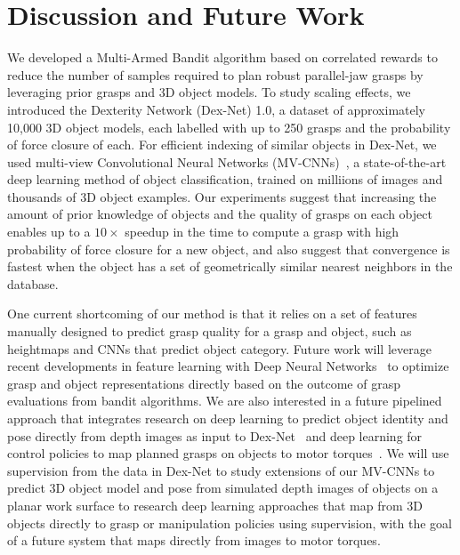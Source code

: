 \section{Discussion and Future Work}
We developed a Multi-Armed Bandit algorithm based on correlated rewards to reduce the number of samples required to plan robust parallel-jaw grasps by leveraging prior grasps and 3D object models.
To study scaling effects, we introduced the Dexterity Network (Dex-Net) 1.0, a dataset of approximately 10,000 3D object models, each labelled with up to 250 grasps and the probability of force closure of each.
For efficient indexing of similar objects in Dex-Net, we used multi-view Convolutional Neural Networks (MV-CNNs)~\cite{su2015multi}, a state-of-the-art deep learning method of object classification, trained on milliions of images and thousands of 3D object examples.
Our experiments suggest that increasing the amount of prior knowledge of objects and the quality of grasps on each object enables up to a $10\times$ speedup in the time to compute a grasp with high probability of force closure for a new object, and also suggest that convergence is fastest when the object has a set of geometrically similar nearest neighbors in the database.

One current shortcoming of our method is that it relies on a set of features manually designed to predict grasp quality for a grasp and object, such as heightmaps and CNNs that predict object category.
Future work will leverage recent developments in feature learning with Deep Neural Networks~\cite{krizhevsky2012imagenet} to optimize grasp and object representations directly based on the outcome of grasp evaluations from bandit algorithms.
We are also interested in a future pipelined approach that integrates research on deep learning to predict object identity and pose directly from depth images as input to Dex-Net~\cite{guptaCVPR15a} and deep learning for control policies to map planned grasps on objects to motor torques~\cite{levine2015end}. 
We will use supervision from the data in Dex-Net to study extensions of our MV-CNNs to predict 3D object model and pose from simulated depth images of objects on a planar work surface to research deep learning approaches that map from 3D objects directly to grasp or manipulation policies using supervision, with the goal of a future system that maps directly from images to motor torques.

